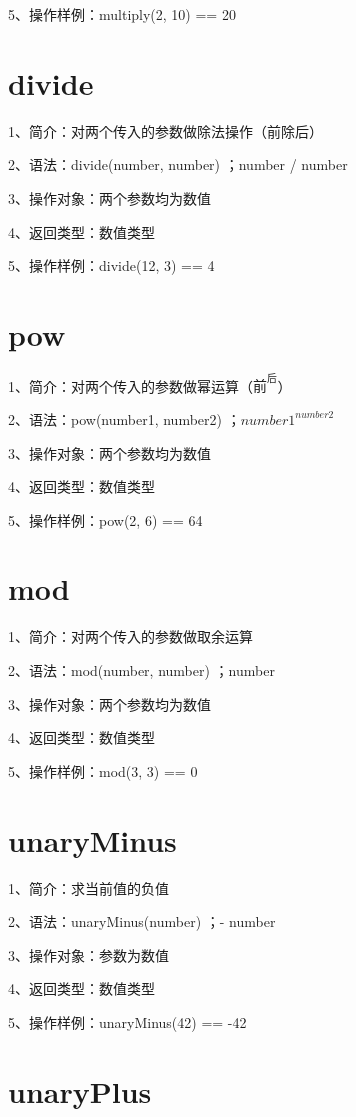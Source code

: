 5、操作样例：multiply(2, 10) == 20

\section{divide}

1、简介：对两个传入的参数做除法操作（前除后）

2、语法：divide(number, number) ；number / number

3、操作对象：两个参数均为数值

4、返回类型：数值类型

5、操作样例：divide(12, 3) == 4

\section{pow}

1、简介：对两个传入的参数做幂运算（$\text{前}^\text{后}$）

2、语法：pow(number1, number2) ；$number1 ^ {number2}$

3、操作对象：两个参数均为数值

4、返回类型：数值类型

5、操作样例：pow(2, 6) == 64

\section{mod}

1、简介：对两个传入的参数做取余运算

2、语法：mod(number, number) ；number %

3、操作对象：两个参数均为数值

4、返回类型：数值类型

5、操作样例：mod(3, 3) == 0

\section{unaryMinus}

1、简介：求当前值的负值

2、语法：unaryMinus(number) ；- number

3、操作对象：参数为数值

4、返回类型：数值类型

5、操作样例：unaryMinus(42) == -42

\section{unaryPlus}

